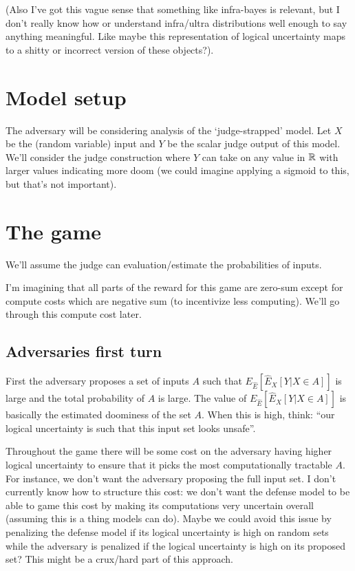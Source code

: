 \documentclass{pset}
\begin{document}
(Also I've got this vague sense that something like infra-bayes is relevant, but
I don't really know how or understand infra/ultra distributions well enough to
say anything meaningful. Like maybe this representation of logical uncertainty
maps to a shitty or incorrect version of these objects?).

\section{Model setup}

The adversary will be considering analysis of the `judge-strapped' model. Let
$X$ be the (random variable) input and $Y$ be the scalar judge output of this model. We'll
consider the judge construction where $Y$ can take on any value in $\mathbb{R}$ with
larger values indicating more doom (we could imagine applying a sigmoid to
this, but that's not important).

\section{The game}

We'll assume the judge can evaluation/estimate the probabilities of
inputs.

I'm imagining that all parts of the reward for this game are zero-sum except
for compute costs which are negative sum (to incentivize less computing). We'll
go through this compute cost later.

\subsection{Adversaries first turn}

First the adversary proposes a set of inputs $A$ 
such that $E_{\hat{E}}[\hat{E}_X[Y | X \in A]]$ is large and the total probability
of $A$ is large. 
The value of $E_{\hat{E}}[\hat{E}_X[Y | X \in A]]$ is basically
the estimated doominess of the set $A$.
When this is high, think: ``our logical uncertainty is such that this input set
looks unsafe''.

Throughout the game there will be some cost on the adversary having higher
logical uncertainty to ensure that it picks the most computationally tractable
$A$. For instance, we don't want the adversary proposing the full input
set. I don't currently know how to structure this cost: we don't want the
defense model to be able to game this cost by making its computations very
uncertain overall (assuming this is a thing models can do). Maybe we could
avoid this issue by penalizing the defense model if its logical uncertainty
is high on random sets while the adversary is penalized if the logical
uncertainty is high on its proposed set? This might be a crux/hard
part of this approach.
\end{document}
